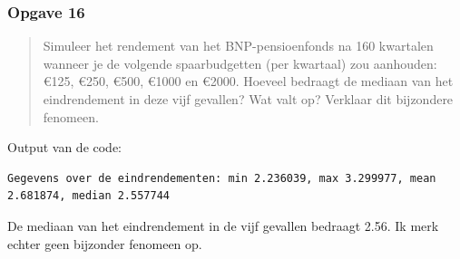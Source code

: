 \documentclass[11pt, a4paper, titlepage, openright]{article}
\begin{document}
	\newpage
	\subsubsection{Opgave 16}
		\begin{quote}
			Simuleer het rendement van het BNP-pensioenfonds na 160 kwartalen wanneer je de volgende spaarbudgetten (per kwartaal) 
			zou aanhouden: \euro125, \euro250, \euro500, \euro1000 en \euro2000. Hoeveel bedraagt de mediaan van het eindrendement
			in deze vijf gevallen? Wat valt op? Verklaar dit bijzondere fenomeen.
		\end{quote}
		
		\noindent Output van de code:
\begin{lstlisting}
Gegevens over de eindrendementen: min 2.236039, max 3.299977, mean 2.681874, median 2.557744\end{lstlisting}
		De mediaan van het eindrendement in de vijf gevallen bedraagt 2.56. Ik merk echter geen bijzonder fenomeen op.
\end{document}
